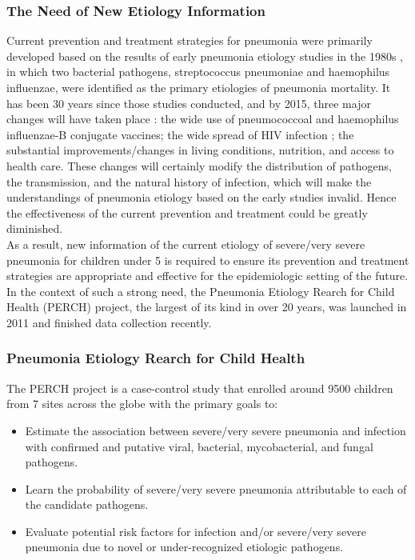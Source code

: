 \documentclass[11 pt, a4paper]{article}  %
\begin{document}
\subsubsection{The Need of New Etiology Information}
Current prevention and treatment strategies for pneumonia were primarily developed based on the results of early pneumonia etiology studies in the 1980s \cite{shann1986etiology, world1990programme}, in which two bacterial pathogens, streptococcus pneumoniae and haemophilus influenzae, were identified as the primary etiologies of pneumonia mortality. It has been 30 years since those studies conducted, and by 2015, three major changes will have taken place \cite{levine2012pneumonia}: the wide use of pneumococcoal and haemophilus influenzae-B conjugate vaccines; the wide spread of HIV infection \cite{calder2009evidence}; the substantial improvements/changes in living conditions, nutrition, and access to health care. These changes will certainly modify the distribution of pathogens, the transmission, and the natural history of infection, which will make the understandings of pneumonia etiology based on the early studies invalid. Hence the effectiveness of the current prevention and treatment could be greatly diminished. \\

As a result, new information of the current etiology of severe/very severe pneumonia for children under 5 is required to ensure its prevention and treatment strategies are appropriate and effective for the epidemiologic setting of the future. In the context of such a strong need, the Pneumonia Etiology Rearch for Child Health (PERCH) project, the largest of its kind in over 20 years, was launched in 2011 and finished data collection recently.\\


\subsubsection{Pneumonia Etiology Rearch for Child Health}
The PERCH project is a case-control study that enrolled around 9500 children from 7 sites across the globe with the primary goals \cite{levine2012pneumonia} to: 
\begin{itemize}
\item Estimate the association between severe/very severe pneumonia and infection with confirmed and putative viral, bacterial, mycobacterial, and fungal pathogens.
\item Learn the probability of severe/very severe pneumonia attributable to each of the candidate pathogens.
\item Evaluate potential risk factors for infection and/or severe/very severe pneumonia due to novel or under-recognized etiologic pathogens. 
\end{itemize} 
\end{document}
